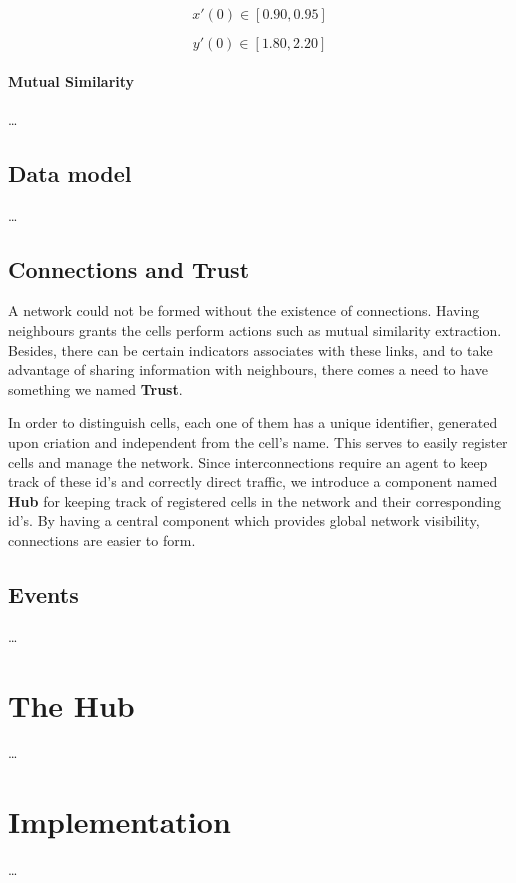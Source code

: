 \begin{equation}
    x'(0) \in [0.90, 0.95]
\end{equation}

\begin{equation}
    y'(0) \in [1.80, 2.20]
\end{equation}

\paragraph{Mutual Similarity}
\dots

\subsection{Data model}

\dots

\subsection{Connections and Trust}

A network could not be formed without the existence of connections. Having neighbours grants the cells perform actions such as mutual similarity extraction. Besides, there can be certain indicators associates with these links, and to take advantage of sharing information with neighbours, there comes a need to have something we named \textbf{Trust}.

In order to distinguish cells, each one of them has a unique identifier, generated upon criation and independent from the cell's name. This serves to easily register cells and manage the network. Since interconnections require an agent to keep track of these id's and correctly direct traffic, we introduce a component named \textbf{Hub} for keeping track of registered cells in the network and their corresponding id's. By having a central component which provides global network visibility, connections are easier to form.


\subsection{Events}

\dots


\section{The Hub}

\dots


\section{Implementation}

\dots
